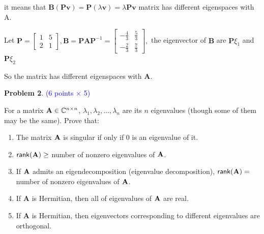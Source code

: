 \documentclass[english,onecolumn]{IEEEtran}
\newcommand{\bA}{{\bf A}}
\def\A{\mathbf{A}}
\begin{document}
\begin{enumerate}
    it means that $\mathbf{B}(\mathbf{P} \mathbf{v}) = \mathbf{P}(\lambda \mathbf{v}) = \lambda \mathbf{P} \mathbf{v}$
    matrix has different eigenspaces with $\mathrm{A}$.
    
Let $\mathbf{P} = \left[\begin{array}{ll}1 & 5 \\ 2 & 1\end{array}\right], \mathbf{B} = \mathbf{P A P}^{-1} =
\left[\begin{array}{cc}-\frac{4}{3} & \frac{5}{3} \\ -\frac{2}{3} & \frac{7}{3}\end{array}\right],
$ the eigenvector of $\mathbf{B}$ are $\mathbf{P} \xi_1$ and $\mathbf{P} \xi_2$ 

So the matrix has different eigenspaces with $\mathbf{A}$.
\end{enumerate}


\newpage
\noindent\textbf{Problem 2}. \textcolor{blue}{(6 points $\times$ 5)}

\noindent
For a matrix ${\bf A}\in \mathbb{C}^{n\times n}$, 
$\lambda_1, \lambda_2, \ldots, \lambda_n$   are its $n$ eigenvalues 
(though some of them may be the same). 
Prove that:
\begin{enumerate}
    \item The matrix ${\bf A}$ is singular if only if 0 is an eigenvalue of it.
    \item ${\sf rank}({\bf A}) \geq$ number of nonzero eigenvalues of ${\bf A}$.
    \item If ${\bf A}$ admits an  eigendecomposition (eigenvalue decomposition), ${\sf rank}({\bf A}) =$ number of nonzero eigenvalues of ${\bf A}$.
    \item If $\A$ is Hermitian, then all of eigenvalues of $\bA$ are real.
    \item If $\A$ is Hermitian, then eigenvectors corresponding to different eigenvalues are orthogonal.
\end{enumerate}
\end{document}
